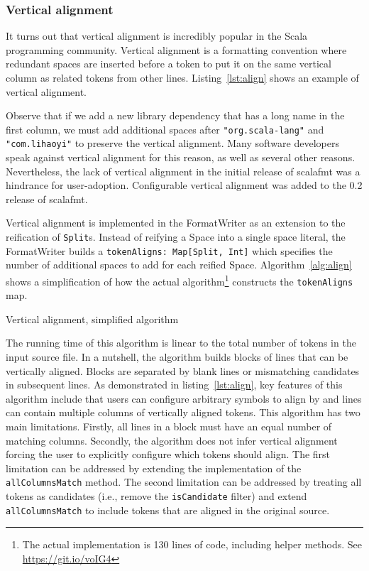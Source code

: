 \subsubsection{Vertical alignment}
It turns out that vertical alignment is incredibly popular in the Scala programming community.
Vertical alignment is a formatting convention where redundant spaces are inserted before a token to put it on the same vertical column as related tokens from other lines.
Listing~\ref{lst:align} shows an example of vertical alignment.
\begin{minipage}{\linewidth}
  
\begin{minipage}{\linewidth}
Observe that if we add a new library dependency that has a long name in the first column, we must add additional spaces after \texttt{"org.scala-lang"} and \texttt{"com.lihaoyi"} to preserve the vertical alignment.
Many software developers speak against vertical alignment for this reason, as well as several other reasons.
Nevertheless, the lack of vertical alignment in the initial release of scalafmt was a hindrance for user-adoption.
Configurable vertical alignment was added to the 0.2 release of scalafmt.

Vertical alignment is implemented in the FormatWriter as an extension to the reification of \texttt{Split}s.
Instead of reifying a Space into a single space literal,
the FormatWriter builds a \texttt{tokenAligns: Map[Split, Int]} which specifies the number of additional spaces to add for each reified Space.
Algorithm~\ref{alg:align} shows a simplification of how the actual algorithm\footnote{
  The actual implementation is 130 lines of code, including helper methods. See
\href{https://git.io/voIG4}{https://git.io/voIG4}}
constructs the \texttt{tokenAligns} map.
\begin{algorithm}
  \caption{Vertical alignment, simplified algorithm}\label{alg:align}
  
\end{algorithm}
The running time of this algorithm is linear to the total number of tokens in the input source file.
In a nutshell, the algorithm builds blocks of lines that can be vertically aligned.
Blocks are separated by blank lines or mismatching candidates in subsequent lines.
As demonstrated in listing~\ref{lst:align}, key features of this algorithm include that users can configure arbitrary symbols to align by and lines can contain multiple columns of vertically aligned tokens.
This algorithm has two main limitations.
Firstly, all lines in a block must have an equal number of matching columns.
Secondly, the algorithm does not infer vertical alignment forcing the user to explicitly configure which tokens should align.
The first limitation can be addressed by extending the implementation of the \texttt{allColumnsMatch} method.
The second limitation can be addressed by treating all tokens as candidates (i.e., remove the \texttt{isCandidate} filter) and extend \texttt{allColumnsMatch} to include tokens that are aligned in the original source.


\end{minipage}
\end{minipage}
